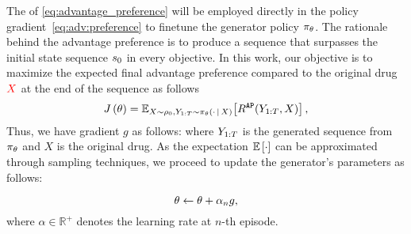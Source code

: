 The  of \eqref{eq:advantage_preference} will be employed directly in the policy gradient~\eqref{eq:adv:preference} to finetune the {generator} policy $\pi_{{\theta}}$. The rationale behind the advantage preference is
to produce a sequence that surpasses the initial state sequence $s_0$ in every objective.
{In this work, our objective is to maximize the expected final advantage preference compared to the original drug ${\color{red} X}$
at the end of the sequence as follows
\begin{equation}
 J \left( {\theta} \right) =\mathbb{E}_{{X\sim\rho_0, Y_{1:T}\sim \pi_\theta(\cdot{\,|\,} X)}}\!\left[R^{\mathtt{AP}}(Y_{1:T},X)\right],
 \label{eq:J(theta)}
\end{equation}
}
Thus, we have gradient $g$ as follows:
{where $Y_{1:T}$ is the generated sequence 
from $\pi_{{\theta}}$ and $X$ is the original drug}. As the expectation $\mathbb{E}\left[\cdot\right]$ can be approximated through sampling techniques, we proceed to update the generator's parameters as follows:

\begin{equation}\label{eq:gradient_update}
    \theta\leftarrow\theta+\alpha_n{g},
\end{equation}
where $\alpha\in \mathbb{R}^{+}$ denotes the learning rate at $n$-th episode. 

















































